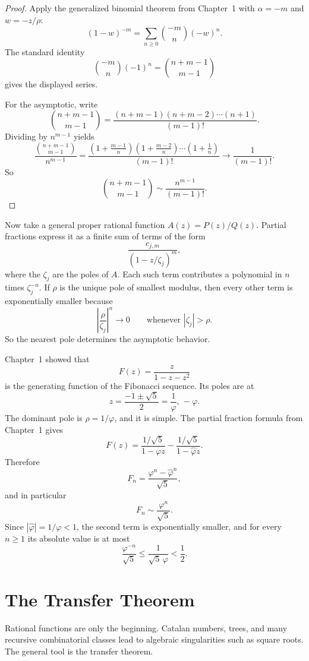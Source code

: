 \begin{proof}
Apply the generalized binomial theorem from Chapter~1 with $\alpha=-m$ and $w=-z/\rho$:
\[
  (1-w)^{-m} = \sum_{n \ge 0} \binom{-m}{n}(-w)^n.
\]
The standard identity
\[
  \binom{-m}{n}(-1)^n = \binom{n+m-1}{m-1}
\]
gives the displayed series.

For the asymptotic, write
\[
  \binom{n+m-1}{m-1} = \frac{(n+m-1)(n+m-2)\cdots(n+1)}{(m-1)!}.
\]
Dividing by $n^{m-1}$ yields
\[
  \frac{\binom{n+m-1}{m-1}}{n^{m-1}}
  = \frac{(1+\frac{m-1}{n})(1+\frac{m-2}{n})\cdots(1+\frac{1}{n})}{(m-1)!}
  \to \frac{1}{(m-1)!}.
\]
So
\[
  \binom{n+m-1}{m-1} \sim \frac{n^{m-1}}{(m-1)!}.
\]
\end{proof}

Now take a general proper rational function $A(z)=P(z)/Q(z)$. Partial fractions express it as a finite sum of terms of the form
\[
  \frac{c_{j,m}}{(1-z/\zeta_j)^m},
\]
where the $\zeta_j$ are the poles of $A$. Each such term contributes a polynomial in $n$ times $\zeta_j^{-n}$. If $\rho$ is the unique pole of smallest modulus, then every other term is exponentially smaller because
\[
  \left|\frac{\rho}{\zeta_j}\right|^n \to 0
  \qquad\text{whenever } |\zeta_j|>\rho.
\]
So the nearest pole determines the asymptotic behavior.

\begin{example}
Chapter~1 showed that
\[
  F(z) = \frac{z}{1-z-z^2}
\]
is the generating function of the Fibonacci sequence. Its poles are at
\[
  z = \frac{-1 \pm \sqrt{5}}{2} = \frac{1}{\varphi},\, -\varphi.
\]
The dominant pole is $\rho = 1/\varphi$, and it is simple. The partial fraction formula from Chapter~1 gives
\[
  F(z) = \frac{1/\sqrt{5}}{1-\varphi z} - \frac{1/\sqrt{5}}{1-\hat\varphi z}.
\]
Therefore
\[
  F_n = \frac{\varphi^n - \hat\varphi^n}{\sqrt{5}},
\]
and in particular
\[
  F_n \sim \frac{\varphi^n}{\sqrt{5}}.
\]
Since $|\hat\varphi|=1/\varphi<1$, the second term is exponentially smaller, and for every $n \ge 1$ its absolute value is at most
\[
  \frac{\varphi^{-n}}{\sqrt{5}} \le \frac{1}{\sqrt{5}\,\varphi} < \frac{1}{2}.
\]
\end{example}

\section{The Transfer Theorem}

Rational functions are only the beginning. Catalan numbers, trees, and many recursive combinatorial classes lead to algebraic singularities such as square roots. The general tool is the transfer theorem.

